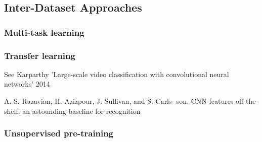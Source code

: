 \subsection{Inter-Dataset Approaches}

\subsubsection{Multi-task learning}

\subsubsection{Transfer learning}

See Karparthy 'Large-scale video classification with convolutional neural networks' 2014

A. S. Razavian, H. Azizpour, J. Sullivan, and S. Carls-
son. CNN features off-the-shelf: an astounding baseline for
recognition

\subsubsection{Unsupervised pre-training}
